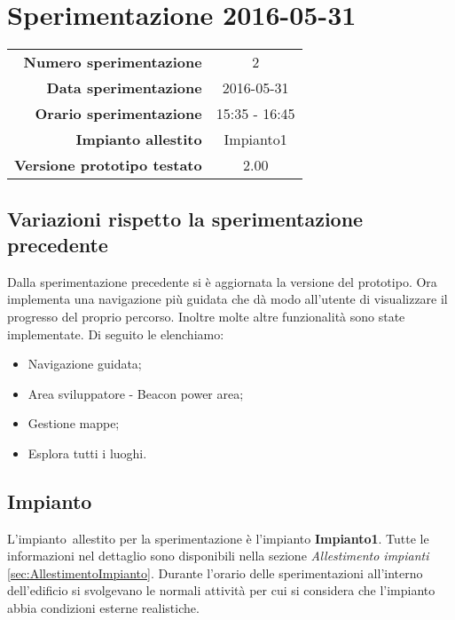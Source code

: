 \documentclass[../Sperimentazione.tex]{subfiles}
\begin{document}
	\section{Sperimentazione 2016-05-31}
	
		\begin{table} [h]
		\centering
		\begin{tabular}[width=0.5\textwidth]{r|c}
			\textbf{Numero sperimentazione} & 2 \\
			\textbf{Data sperimentazione} & 2016-05-31 \\
			\textbf{Orario sperimentazione} & 15:35 - 16:45 \\
			\textbf{Impianto allestito} & Impianto1 \\
			\textbf{Versione prototipo testato} & 2.00 \\		
		\end{tabular}
		\end{table}
		
		\subsection{Variazioni rispetto la sperimentazione precedente}
			Dalla sperimentazione precedente si è aggiornata la versione del prototipo. Ora implementa una navigazione più guidata che dà modo all'utente di visualizzare il progresso del proprio percorso. Inoltre molte altre funzionalità sono state implementate. Di seguito le elenchiamo:
			\begin{itemize}
				\item Navigazione guidata;
				\item Area sviluppatore - Beacon power area;
				\item Gestione mappe;
				\item Esplora tutti i luoghi.
			\end{itemize}
		
		\subsection{Impianto}
		L'impianto\g\ allestito per la sperimentazione è l'impianto \textbf{Impianto1}. Tutte le informazioni nel dettaglio sono disponibili nella sezione \textit{Allestimento impianti} \ref{sec:AllestimentoImpianto}. Durante l'orario delle sperimentazioni all'interno dell'edificio si svolgevano le normali attività per cui si considera che l'impianto abbia condizioni esterne realistiche.


\end{document}
